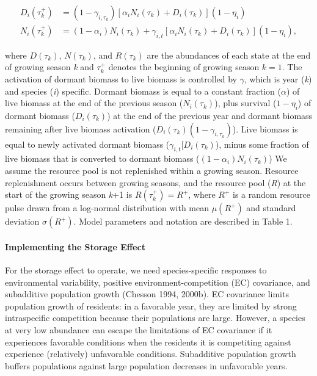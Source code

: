 \documentclass[12pt,]{article}
\begin{document}
\begin{align}
  D_{i}(\tau_k^+) &= (1-\gamma_{i,\tau_k})[\alpha_i N_{i}(\tau_k) + D_{i}(\tau_k)](1-\eta_i) \\
  N_{i}(\tau_k^+) &= (1-\alpha_i)N_{i}(\tau_k) + \gamma_{i,t}[\alpha_i N_{i}(\tau_k) + D_{i}(\tau_k)] (1-\eta_i),
\end{align}

\noindent where \(D(\tau_k)\), \(N(\tau_k)\), and \(R(\tau_k)\) are the
abundances of each state at the end of growing season \emph{k} and
\(\tau_k^+\) denotes the beginning of growing season \(k=1\). The
activation of dormant biomass to live biomass is controlled by
\(\gamma\), which is year (\emph{k}) and species (\emph{i}) specific.
Dormant biomass is equal to a constant fraction (\(\alpha\)) of live
biomass at the end of the previous season (\(N_{i}(\tau_k)\)), plus
survival (\(1-\eta_i\)) of dormant biomass (\(D_{i}(\tau_k)\)) at the
end of the previous year and dormant biomass remaining after live
biomass activation (\(D_{i}(\tau_k)(1-\gamma_{i,\tau_k})\)). Live
biomass is equal to newly activated dormant biomass
(\(\gamma_{i,t}[D_{i}(\tau_k)\)), minus some fraction of live biomass
that is converted to dormant biomass (\((1-\alpha_i)N_{i}(\tau_k)\)) We
assume the resource pool is not replenished within a growing season.
Resource replenishment occurs between growing seasons, and the resource
pool (\emph{R}) at the start of the growing season \emph{k}+1 is
\(R(\tau_k^+) = R^+\), where \(R^+\) is a random resource pulse drawn
from a log-normal distribution with mean \(\mu(R^+)\) and standard
deviation \(\sigma(R^+)\). Model parameters and notation are described
in Table 1.

\paragraph{Implementing the Storage
Effect}\label{implementing-the-storage-effect}

For the storage effect to operate, we need species-specific responses to
environmental variability, positive environment-competition (EC)
covariance, and subadditive population growth (Chesson 1994, 2000b). EC
covariance limits population growth of residents: in a favorable year,
they are limited by strong intraspecific competition because their
populations are large. However, a species at very low abundance can
escape the limitations of EC covariance if it experiences favorable
conditions when the residents it is competiting against experience
(relatively) unfavorable conditions. Subadditive population growth
buffers populations against large population decreases in unfavorable
years.
\end{document}
